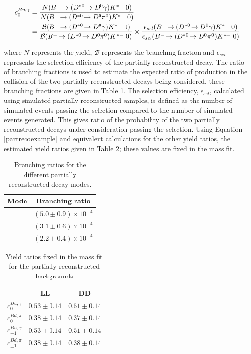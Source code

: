 \begin{align}
c^{Bu,\gamma}_0 &= \frac{N(\decay{\Bm}{(\decay{\Dstarz}{\Dz\gamma})\Kstarm}\ 0)}{N(\decay{\Bm}{(\decay{\Dstarz}{\Dz\piz})\Kstarm}\ 0)} \nonumber \\ 
&= \frac{\mathcal{B}(\decay{\Bm}{(\decay{\Dstarz}{\Dz\gamma})\Kstarm}\ 0)}{\mathcal{B}(\decay{\Bm}{(\decay{\Dstarz}{\Dz\piz})\Kstarm}\ 0)} \times \frac{\epsilon_{sel}(\decay{\Bm}{(\decay{\Dstarz}{\Dz\gamma})\Kstarm}\ 0)}{\epsilon_{sel}(\decay{\Bm}{(\decay{\Dstarz}{\Dz\piz})\Kstarm}\ 0)}
\label{partrecoexample}
\end{align}

where $N$ represents the yield, $\mathcal{B}$ represents the branching fraction and $\epsilon_{sel}$ represents the selection efficiency of the partially reconstructed decay. The ratio of branching fractions is used to estimate the expected ratio of production in the collision of the two partially reconstructed decays being considered, these branching fractions are given in Table \ref{partrecoBRs}. The selection efficiency, $\epsilon_{sel}$, calculated using simulated partially reconstructed samples, is defined as the number of simulated events passing the selection compared to the number of simulated events generated. This gives ratio of the probability of the two partially reconstructed decays under consideration passing the selection. Using Equation \ref{partrecoexample} and equivalent calculations for the other yield ratios, the estimated yield ratios given in Table \ref{fixedyieldratios}; these values are fixed in the mass fit. 

\begin{table}[h]
\centering
\begin{tabular}{c|c}
Mode & Branching ratio \\
\hline
\decay{\Bm}{(\decay{\Dstarz}{\Dz\piz})\Kstarm} & $(5.0 \pm 0.9) \times 10^{-4}$ \\
\decay{\Bm}{(\decay{\Dstarz}{\Dz\gamma})\Kstarm} & $(3.1 \pm 0.6) \times 10^{-4}$ \\
\decay{\Bd}{(\decay{\Dstarp}{\Dz\pip})\Kstarm} & $(2.2 \pm 0.4) \times 10^{-4}$ \\
\end{tabular}
\caption{Branching ratios for the different partially reconstructed decay modes.}
\label{partrecoBRs}
\end{table}

\begin{table}[h]
\centering
\begin{tabular}{ccc}
\hline
& LL & DD \\
\hline
$c^{Bu,\gamma}_0$ & $0.53 \pm 0.14$ & $0.51 \pm 0.14$ \\[3mm]
$c^{Bd,\pi}_0$ & $0.38 \pm 0.14$ & $0.37 \pm 0.14$ \\[3mm]
$c^{Bu,\gamma}_{\pm 1}$ & $0.53 \pm 0.14$ & $0.51 \pm 0.14$ \\[3mm]
$c^{Bd,\pi}_{\pm 1}$ & $0.38 \pm 0.14$ & $0.38 \pm 0.14$ \\[3mm]
\hline
\end{tabular}
\caption{Yield ratios fixed in the mass fit for the partially reconstructed backgrounds}
\label{fixedyieldratios}
\end{table}


